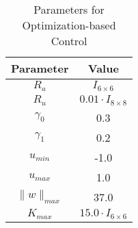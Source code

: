     \begin{table}[H]
        \captionsetup{justification=centering}
        \caption{Parameters for Optimization-based Control}
        \begin{center}
        \begin{tabular}{|c|c|}
        \hline
        \textbf{Parameter} & \textbf{Value} \\ \hline
        $R_a$ & $I_{6 \times 6}$ \\
        $R_u$ & $0.01 \cdot I_{8 \times 8}$ \\
        $\gamma_0$ & 0.3 \\
        $\gamma_1$ & 0.2 \\
        $u_{min}$ & -1.0 \\
        $u_{max}$ & 1.0 \\
        $\|w\|_{max} $ & 37.0 \\
        $K_{max}$ & $15.0 \cdot I_{6 \times 6}$\\ \hline
        \end{tabular}
        \end{center}
        \label{table:opt_coefs}
    \end{table}
